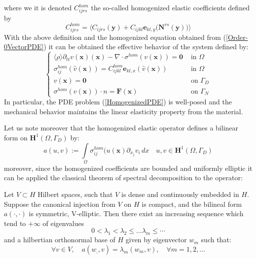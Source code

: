 where we it is denoted $C_{ijrs}^{hom}$ the so-called homogenized elastic coefficients defined by 
\begin{equation*}
    C_{ijrs}^{hom} = \big \langle C_{ijrs}(\mathbf{y}) + C_{ijkl}\mathbf{e}_{kl,y}\big(\mathbf{N}^{rs}(\mathbf{y})\big) \big \rangle 
\end{equation*}
With the above definition and the homogenized equation obtained from (\ref{Order-0VectorPDE}) it can be obtained the effective behavior of the system defined by:
\begin{equation}
    \label{HomogenizedPDE}
    \left \{
    \begin{array}{cc}
        \langle \rho \rangle \partial_{tt} v(\mathbf{x}) (\mathbf{x}) - \nabla \cdot \sigma^{hom} (v(\mathbf{x}) ) = \mathbf{0} & \text{ in } \Omega \\
        \sigma^{hom}_{ij}(\hat{v}(\mathbf{x})) = C^{hom}_{ijkl}\mathbf{e}_{kl,x}(\hat{v}(\mathbf{x})) & \text{ in } \Omega \\
        v(\mathbf{x}) = \mathbf{0} & \text{ on } \Gamma_D \\
        \sigma^{hom}(v(\mathbf{x})) \cdot n = \mathbf{F}(\mathbf{x}) & \text{ on } \Gamma_N
    \end{array}
    \right .
\end{equation}
In particular, the PDE problem (\ref{HomogenizedPDE}) is well-posed and the mechanical behavior maintains the linear elasticity property from the material.

Let us note moreover that the homogenized elastic operator defines a bilinear form on $\mathbf{H}^1(\Omega, \Gamma_D)$ by:
\begin{equation*}
    a(u,v) := \int \limits_{\Omega} \sigma^{hom}_{ij}(u(\mathbf{x}) \partial_{x_j} v_i \, dx \quad u,v \in \mathbf{H}^1(\Omega, \Gamma_D)
\end{equation*}
moreover, since the homogenized coefficients are bounded and uniformly elliptic it can be applied the classical theorem of spectral decomposition to the operator:
\begin{prop}
\label{EigenValuesProp}
Let $V \subset H$ Hilbert spaces, such that $V$ is dense and continuously embedded in $H$. Suppose the canonical injection from $V$ on $H$ is compact, and the bilineal form $a(\cdot, \cdot)$ is symmetric, V-elliptic. Then there exist an increasing sequence which tend to $+ \infty$ of eigenvalues
\begin{equation*}
    0 < \lambda_1 < \lambda_2  \leq \dots \lambda_m \leq \cdots 
\end{equation*}
and a hilbertian orthonormal base of $H$ given by eigenvector $w_m$ such that:
\begin{equation*}
    \forall v \in V, \quad a(w_,, v) = \lambda_m (w_m, v), \quad \forall m = 1, 2, \dots
\end{equation*}
\end{prop}



